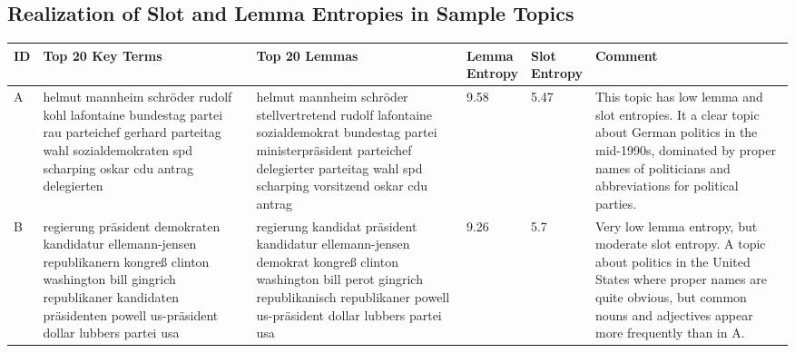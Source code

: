 \documentclass[11pt,a4paper]{article}
\begin{document}


\pagebreak


\onecolumn
\begin{landscape}
\appendix
    \thispagestyle{empty}

\section{Realization of Slot and Lemma Entropies in Sample Topics}
\label{sec:slot_lemma_entropy_examples}
\begin{table*}[h!]
    \centering
    \begin{tabularx}{\textwidth}{|l|X|X|l|l|X|} \hline
        ID & Top 20 Key Terms & Top 20 Lemmas & \thead{Lemma\\Entropy} & \thead{Slot\\Entropy} & Comment \\ \hline
        A & helmut mannheim schr{\"o}der rudolf kohl lafontaine bundestag partei rau parteichef gerhard parteitag wahl sozialdemokraten spd scharping oskar cdu antrag delegierten & helmut mannheim schr{\"o}der stellvertretend rudolf lafontaine sozialdemokrat bundestag partei ministerpr{\"a}sident parteichef delegierter parteitag wahl spd scharping vorsitzend oskar cdu antrag & 9.58 & 5.47  & This topic has low lemma and slot entropies. It a clear topic about German politics in the mid-1990s, dominated by proper names of politicians and abbreviations for political parties. \\ \hline
        B & regierung pr{\"a}sident demokraten kandidatur ellemann-jensen republikanern kongre{\ss} clinton washington bill gingrich republikaner kandidaten pr{\"a}sidenten powell us-pr{\"a}sident dollar lubbers partei usa & regierung kandidat pr{\"a}sident kandidatur ellemann-jensen demokrat kongre{\ss} clinton washington bill perot gingrich republikanisch republikaner powell us-pr{\"a}sident dollar lubbers partei usa & 9.26 & 5.7 & Very low lemma entropy, but moderate slot entropy. A topic about politics in the United States where proper names are quite obvious, but common nouns and adjectives appear more frequently than in A. \\ \hline

\end{tabularx}
\end{table*}
\end{landscape}
\end{document}
